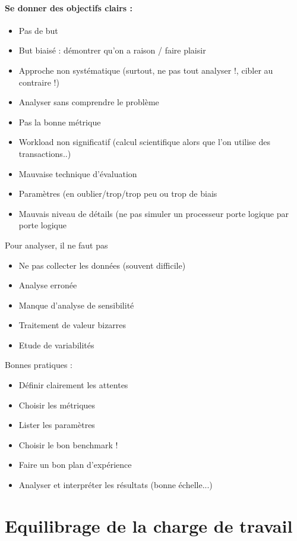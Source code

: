 \documentclass{article}
\begin{document}
\paragraph{Se donner des objectifs clairs :}
\begin{itemize}
\item Pas de but
\item But biaisé : démontrer qu'on a raison / faire plaisir
\item Approche non systématique (surtout, ne pas tout analyser !, cibler au contraire !)
\item Analyser sans comprendre le problème
\item Pas la bonne métrique
\item Workload non significatif (calcul scientifique alors que l'on utilise des transactions..)
\item Mauvaise technique d'évaluation
\item Paramètres (en oublier/trop/trop peu ou trop de biais
\item Mauvais niveau de détails (ne pas simuler un processeur porte logique par porte logique
\end{itemize}

Pour analyser, il ne faut pas
\begin{itemize}
\item Ne pas collecter les données (souvent difficile)
\item Analyse erronée
\item Manque d'analyse de sensibilité
\item Traitement de valeur bizarres
\item Etude de variabilités
\end{itemize}

Bonnes pratiques :
\begin{itemize}
\item Définir clairement les attentes
\item Choisir les métriques
\item Lister les paramètres
\item Choisir le bon benchmark !
\item Faire un bon plan d'expérience
\item Analyser et interpréter les résultats (bonne échelle...)
\end{itemize}


\section{Equilibrage de la charge de travail}
\end{document}
